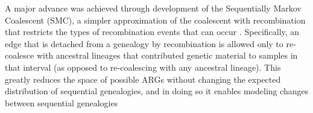 \documentclass[11pt]{article}
\begin{document}
A major advance was achieved through development of the Sequentially Markov 
Coalescent (SMC), a simpler approximation of the coalescent with recombination
that restricts the types of recombination events that can occur 
\citep{mcvean2005approximating}. Specifically,
an edge that is detached from a genealogy by recombination is allowed only to
re-coalesce with ancestral lineages that contributed genetic material to samples
in that interval (as opposed to re-coalescing with any ancestral lineage). 
This greatly reduces the space of possible ARGs without changing the expected
distribution of sequential genealogies, and in doing so it enables modeling
changes between sequential genealogies
\end{document}
